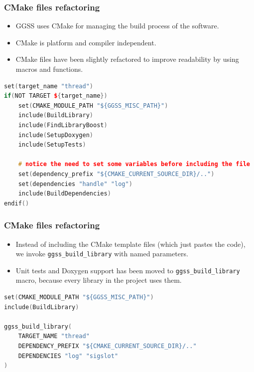 \documentclass[10pt]{beamer}
\begin{document}
\begin{frame}[fragile]
\frametitle{CMake files refactoring}
\begin{itemize}
\item GGSS uses CMake for managing the build process of the software.
\item CMake is platform and compiler independent.
\item CMake files have been slightly refactored to improve readability by using macros and functions.
\end{itemize}
\begin{lstlisting}[language=c++, caption={Old version of CMake used for building \emph{thread-lib}}]
set(target_name "thread")
if(NOT TARGET ${target_name})
    set(CMAKE_MODULE_PATH "${GGSS_MISC_PATH}")
    include(BuildLibrary)
    include(FindLibraryBoost)
    include(SetupDoxygen)
    include(SetupTests)

    # notice the need to set some variables before including the file
    set(dependency_prefix "${CMAKE_CURRENT_SOURCE_DIR}/..")
    set(dependencies "handle" "log")
    include(BuildDependencies)
endif() 
\end{lstlisting}
\end{frame}

\begin{frame}[fragile]
\frametitle{CMake files refactoring}
\begin{itemize}
\item Instead of including the CMake template files (which just pastes the code), we invoke \lstinline[basicstyle=\ttfamily\normalsize]{ggss_build_library} with named parameters.
\item Unit tests and Doxygen support has been moved to \lstinline[basicstyle=\ttfamily\normalsize]{ggss_build_library} macro, because every library in the project uses them.
\end{itemize}
\begin{lstlisting}[language=c++, caption={New version of CMake used for building \emph{thread-lib}}]
set(CMAKE_MODULE_PATH "${GGSS_MISC_PATH}")
include(BuildLibrary)

ggss_build_library(
    TARGET_NAME "thread"
    DEPENDENCY_PREFIX "${CMAKE_CURRENT_SOURCE_DIR}/.."
    DEPENDENCIES "log" "sigslot"
)
\end{lstlisting}
\end{frame}
\end{document}
